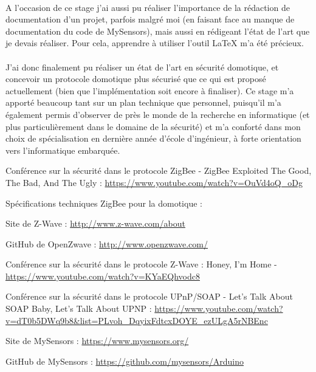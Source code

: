 \documentclass[12 pt]{report}
\begin{document}
\paragraph{} A l'occasion de ce stage j'ai aussi pu réaliser l'importance de la rédaction de documentation d'un projet, parfois malgré moi (en faisant face au manque de documentation du code de MySensors), mais aussi en rédigeant l'état de l'art que je devais réaliser. Pour cela, apprendre à utiliser l'outil LaTeX m'a été précieux.

\paragraph{} J'ai donc finalement pu réaliser un état de l'art en sécurité domotique, et concevoir un protocole domotique plus sécurisé que ce qui est proposé actuellement (bien que l'implémentation soit encore à finaliser). Ce stage m'a apporté beaucoup tant sur un plan technique que personnel, puisqu'il m'a également permis d'observer de près le monde de la recherche en informatique (et plus particulièrement dans le domaine de la sécurité) et m'a conforté dans mon choix de spécialisation en dernière année d'école d'ingénieur, à forte orientation vers l'informatique embarquée.


\begin{thebibliography}{2}
\bibitem{} Conférence sur la sécurité dans le protocole ZigBee - ZigBee Exploited The Good, The Bad, And The Ugly : \url{https://www.youtube.com/watch?v=OuVd4oQ_oDg}

\bibitem{} Spécifications techniques ZigBee pour la domotique : 

\bibitem{} Site de Z-Wave : \url{http://www.z-wave.com/about}

\bibitem{} GitHub de OpenZwave : \url{http://www.openzwave.com/}

\bibitem{} Conférence sur la sécurité dans le protocole Z-Wave : Honey, I'm Home - \url{https://www.youtube.com/watch?v=KYaEQhvodc8}

\bibitem{} Conférence sur la sécurité dans le protocole UPnP/SOAP - Let's Talk About SOAP Baby, Let's Talk About UPNP : \url{https://www.youtube.com/watch?v=dT0b5DWq9b8&list=PLvoh\_DqyixFdtcxDOYE\_ezULgA5rNBEnc}

\bibitem{} Site de MySensors : \url{https://www.mysensors.org/}

\bibitem{} GitHub de MySensors : \url{https://github.com/mysensors/Arduino}
\end{thebibliography}
\end{document}
